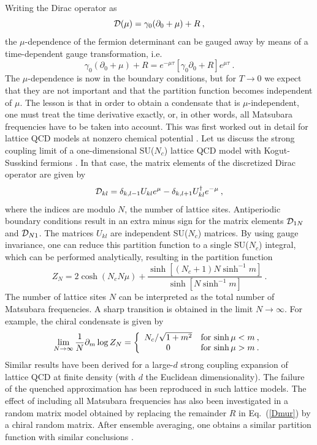 Writing the Dirac operator as
\begin{equation}
  {\cal D}(\mu) = \gamma_0 (\partial_0+\mu) + R\:, 
  \label{Dmur}
\end{equation}
the $\mu$-dependence of the fermion determinant can be gauged away by
means of a time-dependent gauge transformation, i.e.
\begin{equation}
  \gamma_0 (\partial_0+\mu) + R = e^{-\mu\tau}
  \left [\gamma_0\partial_0  + R \right ] e^{\mu\tau}\:.
\end{equation}
The $\mu$-dependence is now in the boundary conditions, but for
$T\to0$ we expect that they are not important and that the partition
function becomes independent of $\mu$.  The lesson is that in order to
obtain a condensate that is $\mu$-independent, one must treat the time
derivative exactly, or, in other words, all Matsubara frequencies
have to be taken into account. This was first worked out in detail for
lattice QCD models at nonzero chemical potential \cite{matstone}. Let
us discuss the strong coupling limit of a one-dimensional SU($N_c$)
lattice QCD model with Kogut-Susskind fermions \cite{Bilic}.  In that
case, the matrix elements of the discretized Dirac operator are given
by
\begin{equation}
  {\cal D}_{kl} = \delta_{k,l-1} U_{kl} e^{\mu} -
  \delta_{k,l+1} U^\dagger_{kl} e^{-\mu} \:,
\end{equation}
where the indices are modulo $N$, the number of lattice sites.
Antiperiodic boundary conditions result in an extra minus sign for
the matrix elements ${\cal D}_{1N}$ and ${\cal D}_{N1}$. The matrices
$U_{kl}$ are independent SU($N_c$) matrices. By using gauge invariance,
one can reduce this partition function to a single SU($N_c$) integral,
which can be performed analytically, resulting in the partition
function
\begin{equation}
  Z_N = 2 \cosh(N_c N \mu) +
  \frac{\sinh [(N_c +1) N \sinh^{-1}m]}{\sinh[ N \sinh^{-1} m]}\:.
\end{equation}
The number of lattice sites $N$ can be interpreted as the total number
of Matsubara frequencies. A sharp transition is obtained in the limit
$N \rightarrow \infty$. For example, the chiral condensate is given by
\cite{Bilic}
\begin{equation}
  \lim_{N\to\infty}\frac 1N \partial_m \log Z_N = \left\{
    \begin{array}{cl}
      N_c/\sqrt{1+m^2} & \hbox{for $\sinh \mu <m$}\:,\\
      0 & \hbox{for $\sinh \mu  > m$}\:.
    \end{array}\right.
\end{equation}
Similar results have been derived for a large-$d$ strong coupling
expansion of lattice QCD at finite density \cite{strong} (with $d$ the
Euclidean dimensionality). The failure of the quenched approximation
has been reproduced in such lattice models.  The effect of including
all Matsubara frequencies has also been investigated in a random
matrix model obtained by replacing the remainder $R$ in Eq.~(\ref{Dmur})
by a chiral random matrix.  After ensemble averaging, one obtains a
similar partition function with similar conclusions \cite{papp}.

